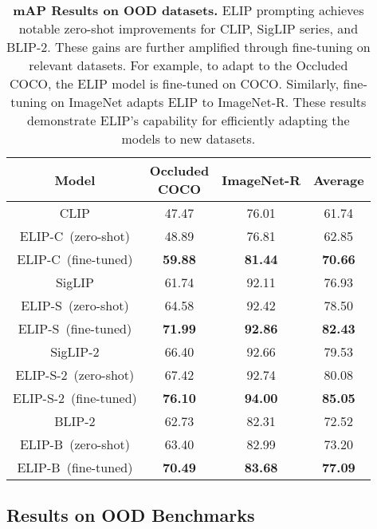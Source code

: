 \begin{table}[h]
    \centering
    \tabcolsep=0.15cm
    \begin{tabular}{c|ccc}
    \toprule 
    Model & \thead{Occluded \\ COCO} & ImageNet-R & Average  \\ 
    \midrule
    CLIP & 47.47 & 76.01 & 61.74 \\ 
    ELIP-C~(zero-shot) & 48.89 & 76.81 & 62.85 \\ 
    ELIP-C~(fine-tuned) & \textbf{59.88} & \textbf{81.44} & \textbf{70.66} \\ 
    
    

    \midrule
    SigLIP & 61.74 & 92.11 & 76.93 \\ 
    ELIP-S~(zero-shot) & 64.58 & 92.42 & 78.50 \\ 
    ELIP-S~(fine-tuned) & \textbf{71.99} & \textbf{92.86} & \textbf{82.43} \\ 
    
    \midrule
    SigLIP-2 & 66.40 & 92.66 & 79.53 \\ 
    ELIP-S-2~(zero-shot) & 67.42 & 92.74 & 80.08 \\ 
    ELIP-S-2~(fine-tuned) & \textbf{76.10} & \textbf{94.00} & \textbf{85.05} \\ 

    \midrule
    BLIP-2 & 62.73 & 82.31 & 72.52 \\ 
    ELIP-B~(zero-shot) &  63.40 & 82.99 & 73.20 \\ 
    ELIP-B~(fine-tuned) & \textbf{70.49} & \textbf{83.68} & \textbf{77.09} \\ 
    
    \bottomrule
    \end{tabular}
    \caption{\textbf{mAP Results on OOD datasets.} 
    ELIP prompting achieves notable zero-shot improvements for CLIP, SigLIP series, and BLIP-2. These gains are further amplified through fine-tuning on relevant datasets. 
    For example, to adapt to the Occluded COCO, the ELIP model is fine-tuned on COCO. Similarly, fine-tuning on ImageNet adapts ELIP to ImageNet-R. These results demonstrate ELIP's capability for efficiently adapting the models to new datasets. 
    }
    \label{tab:ood_result}
\end{table}

\subsection{Results on OOD Benchmarks}
\label{sec:ood_result}


